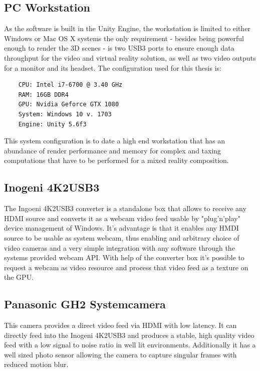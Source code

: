\subsection{PC Workstation}

As the software is built in the Unity Engine, the workstation is limited to 
either Windows or Mac OS X systems the only requirement - besides being 
powerful enough to render the 3D scenes - is two USB3 ports to ensure enough 
data throughput for the video and virtual reality solution, as well as two 
video outputs for a monitor and its headset.
\newline
The configuration used for this thesis is:
\begin{lstlisting}
	CPU: Intel i7-6700 @ 3.40 GHz
	RAM: 16GB DDR4
	GPU: Nvidia Geforce GTX 1080
	System: Windows 10 v. 1703
	Engine: Unity 5.6f3
\end{lstlisting}

This system configuration is to date a high end workstation that has an 
abundance of render performance and memory for complex and taxing computations 
that have to be performed for a mixed reality composition. 

\subsection{Inogeni 4K2USB3}
The Ingoeni 4K2USB3 converter is a standalone box that allows to receive any 
HDMI source and converts it as a webcam video feed usable by "plug'n'play" 
device management of Windows. It's advantage is that it enables any HMDI source 
to be usable as system webcam, thus enabling and arbitrary choice of video 
cameras and a very simple integration with any software through the systems 
provided webcam API. With help of the converter box it's possible to request a 
webcam as video resource and process that video feed as a texture on the GPU.

\subsection{Panasonic GH2 Systemcamera}
This camera provides a direct video feed via HDMI with low latency. It can 
directly feed into the Inogeni 4K2USB3 and produces a stable, high quality 
video feed with a low signal to noise ratio in well lit environments. 
Additionally it has a well sized photo sensor allowing the camera to capture 
singular frames with reduced motion blur.

